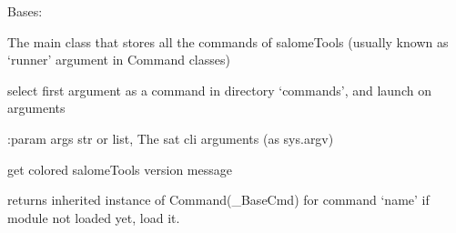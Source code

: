 \documentclass[a4paper,10pt,english]{sphinxmanual}
\begin{document}
\begin{fulllineitems}
\label{commands/apidoc/src:src.salomeTools.Sat}
Bases: 

The main class that stores all the commands of salomeTools
(usually known as `runner' argument in Command classes)

\begin{fulllineitems}
\label{commands/apidoc/src:src.salomeTools.Sat.assumeAsList}
\end{fulllineitems}


\begin{fulllineitems}
\label{commands/apidoc/src:src.salomeTools.Sat.execute_cli}
select first argument as a command in directory `commands', and launch on arguments

:param args str or list, The sat cli arguments (as sys.argv)

\end{fulllineitems}


\begin{fulllineitems}
\label{commands/apidoc/src:src.salomeTools.Sat.getColoredVersion}
get colored salomeTools version message

\end{fulllineitems}


\begin{fulllineitems}
\label{commands/apidoc/src:src.salomeTools.Sat.getCommandAndAppli}
\end{fulllineitems}


\begin{fulllineitems}
\label{commands/apidoc/src:src.salomeTools.Sat.getCommandInstance}
returns inherited instance of Command(\_BaseCmd) for command `name'
if module not loaded yet, load it.


\end{fulllineitems}
\end{fulllineitems}
\end{document}
